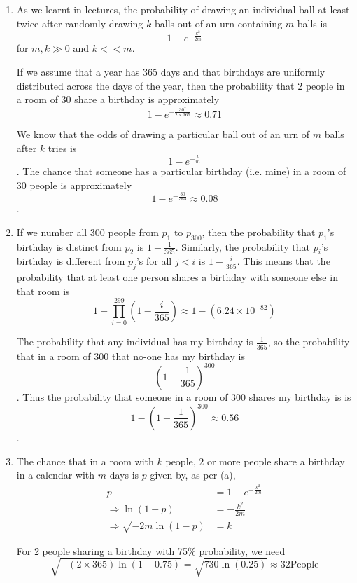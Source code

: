 \begin{enumerate}
\item 
As we learnt in lectures\cite{Slides_43}, the probability of drawing an
individual ball at least twice after randomly drawing $k$ balls out of an
urn containing $m$ balls is \[1 - e^{-\frac{k^2}{2m}}\] for $m,k \gg 0$
and $k << m$. 

If we assume that a year has 365 days and that birthdays are uniformly
distributed across the days of the year, then the probability that
2 people in a room of 30 share a birthday is approximately 
\[1 - e^{-\frac{30^2}{2 \times 365}} \approx 0.71 \]

We know that the odds of drawing a particular ball out of an urn of $m$ balls
after $k$ tries 
 is \[1-e^{-\frac{k}{m}}\]\cite{Slides_36}. The chance that someone has a
 particular birthday (i.e. mine) in a room of 30 people is approximately \[1 -
 e^{-\frac{30}{365}} \approx 0.08\].

\item

If we number all 300 people from $p_1$ to $p_{300}$, then the probability that
$p_1$'s birthday is distinct from $p_2$ is $1-\frac{1}{365}$. Similarly, the
probability that $p_i$'s birthday is different from $p_j$'s for all $j < i$ is $1 -
\frac{i}{365}$. This means that the probability that at least one person shares
a birthday with someone else in that room is 
\[1 - \prod^{299}_{i=0} \left(1 - \frac{i}{365} \right) \approx
1 - (6.24 \times 10^{-82})\]

The probability that any individual has my birthday is $\frac{1}{365}$, so the
probability that in a room of 300 that no-one has my birthday is \[\left(1 -
\frac{1}{365} \right)^{300}\]. Thus the probability that someone in a room of 300
shares my birthday is is \[1- \left(1 - \frac{1}{365} \right)^{300} \approx
0.56\].

\item
The chance that in a room with $k$ people, $2$ or more people share a birthday
in a calendar with $m$ days is $p$ given by, as per (a),
\begin{align*}
p &=1 - e^{-\frac{k^2}{2m}} \\
\Rightarrow \ln(1-p) &= - \frac{k^2}{2m} \\
\Rightarrow \sqrt{-2m\ln(1-p)} &= k
\end{align*}

For 2 people sharing a birthday with 75\% probability, we need
\[\sqrt{-(2 \times 365)\ln(1-0.75)} = \sqrt{730\ln(0.25)} \approx 32 \text{
People}\] 


\end{enumerate}
